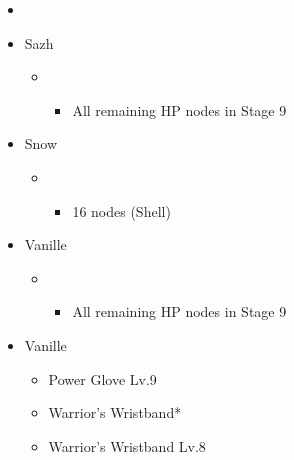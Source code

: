 \begin{menu}
	\begin{itemize}
	\paradigm
		\begin{itemize}
			\item {}%
				{\paradigmline{\com}{\sen}{\com}}%
				{\paradigmline{\com}{(\sen)}{\sab}}%
				{\paradigmline{\rav}{\sen}{\rav}}%
				{\paradigmline{(\sen)}{(\sen)}{(\com)}}%
				{\paradigmline{\syn}{\sen}{(\med)}}%
				{\paradigmline[4]{(\sen)}{(\rav)}{(\sab)}}%
		\end{itemize}
	\crystarium
		\begin{itemize}
			\item Sazh
				\begin{itemize}
					\item \rav
						\begin{itemize}
							\item All remaining HP nodes in Stage 9
						\end{itemize}		
				\end{itemize}
			\item Snow
				\begin{itemize}
					\item \syn
						\begin{itemize}
							\item 16 nodes (Shell)
						\end{itemize}
				\end{itemize}
			\item Vanille
				\begin{itemize}
					\item \rav
						\begin{itemize}
							\item All remaining HP nodes in Stage 9
						\end{itemize}		
				\end{itemize}								
		\end{itemize}
	\equip
		\begin{itemize}
			\item Vanille
				\begin{itemize}
					\item Power Glove Lv.9	
					\item Warrior's Wristband*
					\item Warrior's Wristband Lv.8
				\end{itemize}
		\end{itemize}
	\end{itemize}
\end{menu}

